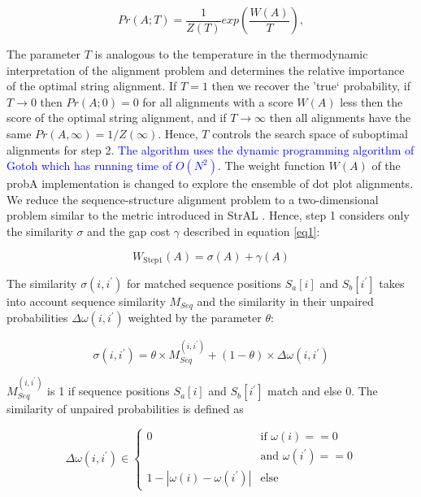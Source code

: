 \documentclass{bmcart}
\begin{document}
\begin{equation}\label{probA}
	Pr(A;T) = \frac{1}{Z(T)} exp( \frac{W(A)}{T} ),
\end{equation}

\noindent The parameter $T$ is analogous to the temperature in the
thermodynamic interpretation of the alignment problem and determines the
relative importance of the optimal string alignment. If $T=1$ then we recover the
'true` probability, if $T\to0$ then $Pr(A;0)=0$ for all alignments with a score
$W(A)$ less then the score of the optimal string alignment, and if $T\to\infty$ then
all alignments have the same $Pr(A,\infty)=1/Z(\infty)$.  Hence, $T$ controls
the search space of suboptimal alignments for step 2. \textcolor{blue}{
The algorithm uses the dynamic programming algorithm of Gotoh \cite{Gotoh7166760} which has running time of $O(N^2)$.} 
The weight function $W(A)$ of
the probA implementation is changed to explore the ensemble of dot plot
alignments. We reduce the sequence-structure alignment problem to a
two-dimensional problem similar to the metric introduced in StrAL
\cite{Dalli16613908}. Hence, step 1 considers only the similarity $\sigma$ and
the gap cost $\gamma$ described in equation \ref{eq1}:

\begin{equation}\label{wstep1}
	W_{\mbox{Step1}}(A) = \sigma(A) + \gamma(A)
\end{equation}

\noindent The similarity $\sigma(i,i^\prime)$ for matched sequence positions $S_a[i]$ and
$S_b[i^\prime]$ takes into account sequence similarity $M_{Seq}$ and the
similarity in their unpaired probabilities $\Delta \omega(i,i^\prime)$ weighted
by the parameter $\theta$:

\begin{equation}\label{sigmam}
	\sigma(i,i^\prime) = \theta \times
		M_{Seq}^{(i,i^\prime)} + (1-\theta) \times \Delta \omega(i,i^\prime)
\end{equation}

\noindent  $M_{Seq}^{(i,i^\prime)}$ is 1 if sequence positions $S_a[i]$ and
$S_b[i^\prime]$ match and else 0. The similarity of unpaired probabilities is
defined as

\begin{equation}\label{eq3}
	\Delta \omega(i,i^\prime) \in \left\{ \begin{array}{cl}
			0 & \textrm{if } \omega(i) == 0 \\
			  & \textrm{and } \omega(i^\prime ) == 0 \\
			1 - | \omega(i) - \omega(i^\prime) | & \textrm{else}
		\end{array}\right.
\end{equation}
\end{document}
